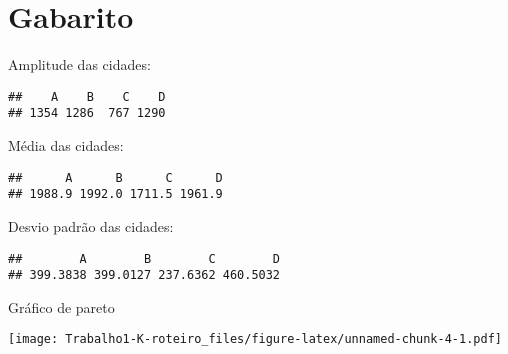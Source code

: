 \documentclass[]{article}
\begin{document}
\section{Gabarito}\label{gabarito}

Amplitude das cidades:

\begin{verbatim}
##    A    B    C    D 
## 1354 1286  767 1290
\end{verbatim}

Média das cidades:

\begin{verbatim}
##      A      B      C      D 
## 1988.9 1992.0 1711.5 1961.9
\end{verbatim}

Desvio padrão das cidades:

\begin{verbatim}
##        A        B        C        D 
## 399.3838 399.0127 237.6362 460.5032
\end{verbatim}

Gráfico de pareto

\texttt{[image: Trabalho1-K-roteiro\_files/figure-latex/unnamed-chunk-4-1.pdf]}\\
\end{document}
